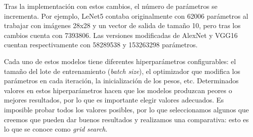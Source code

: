 Tras la implementación con estos cambios, el número de parámetros se incrementa. Por ejemplo, LeNet5 contaba originalmente con 62006 parámetros al trabajar con imágenes 28x28 y un vector de salida de tamaño 10, pero tras los cambios cuenta con 7393806. Las versiones modificadas de AlexNet y VGG16 cuentan respectivamente con 58289538 y 153263298 parámetros.

Cada uno de estos modelos tiene diferentes hiperparámetros configurables: el tamaño del lote de entrenamiento (\textit{batch size}), el optimizador que modifica los parámetros en cada iteración, la inicialización de los pesos, etc. Determinados valores en estos hiperparámetros hacen que los modelos produzcan peores o mejores resultados, por lo que es importante elegir valores adecuados. Es imposible probar todos los valores posibles, por lo que seleccionamos algunos que creemos que pueden dar buenos resultados y realizamos una comparativa: esto es lo que se conoce como \textit{grid search}.

